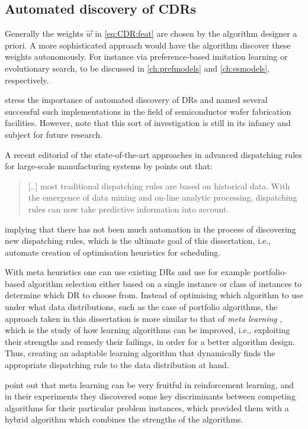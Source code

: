 \subsection*{Automated discovery of CDRs}
Generally the weights $\vec{w}$ in \cref{eq:CDR:feat} are chosen by the 
algorithm designer a priori. 
A more sophisticated approach would have the algorithm discover these 
weights autonomously. For instance via preference-based 
imitation learning or evolutionary search, to be discussed in 
\cref{ch:prefmodels} and \cref{ch:esmodels}, respectively.

\citet{Monch13} stress the importance of automated discovery of DRs and named 
several successful such implementations in the field of semiconductor wafer 
fabrication facilities. 
However, \citeauthor{Monch13} note that this sort of investigation is still in its infancy and subject for future research.

A recent editorial of the state-of-the-art approaches in advanced dispatching 
rules for large-scale manufacturing systems by \citet{Chen13} points out that:
\begin{quote}
	[..] most traditional dispatching rules are based on historical data. With the emergence of data mining and on-line analytic processing, dispatching rules can now take predictive information into account.
\end{quote}
implying that there has not been much automation in the process of discovering 
new dispatching rules, which is the ultimate goal of this dissertation, i.e., 
automate creation of optimisation heuristics for scheduling. 

With meta heuristics one can use existing DRs and use for example 
{portfolio-based algorithm selection} either based 
on a single instance \citep{Rice76,Gomes01} or class of instances \citep{Xu07} 
to determine which DR to choose from. 
Instead of optimising which algorithm to use under what data distributions, 
such as the case of portfolio algorithms, the approach taken in this 
dissertation is more similar to that of \emph{meta learning} \citep{Vilalta02}, 
which is the study of how learning algorithms can be improved, i.e., exploiting 
their strengths and remedy their failings, in order for a better algorithm 
design. Thus, creating an adaptable learning algorithm that dynamically finds 
the appropriate dispatching rule  to the data distribution at hand. 

\citet{Kalyanakrishnan11} point out that meta learning can be very fruitful in 
reinforcement learning, and in their experiments they discovered some key 
discriminants between competing algorithms for their particular problem 
instances, which provided them with a hybrid algorithm which combines the 
strengths of the algorithms.

